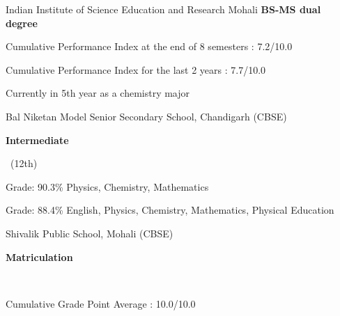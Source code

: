 	{%
		Indian Institute of Science Education and Research Mohali}
	{%
		\textbf{BS-MS dual degree}~}
	{%
	Cumulative Performance Index at the end of 8 semesters : 7.2/10.0
	
	Cumulative Performance Index for the last 2 years : 7.7/10.0
	
	Currently in 5th year as a chemistry major}

		{%
			Bal Niketan Model Senior Secondary School, Chandigarh (CBSE)}
		{%
			\textbf{Intermediate}~\begin{footnotesize}
				~(12th)
			\end{footnotesize}}
		{%
		 Grade: 90.3\%      \hspace{0.4cm}Physics, Chemistry, Mathematics
		 
		 Grade: 88.4\%     \hspace{0.4cm}English, Physics, Chemistry, Mathematics, Physical Education    }

		{%
			Shivalik Public School, Mohali (CBSE)}
		{%
			\textbf{Matriculation}~\begin{footnotesize}
				~
			\end{footnotesize}}
		{%
		Cumulative Grade Point Average : 10.0/10.0}